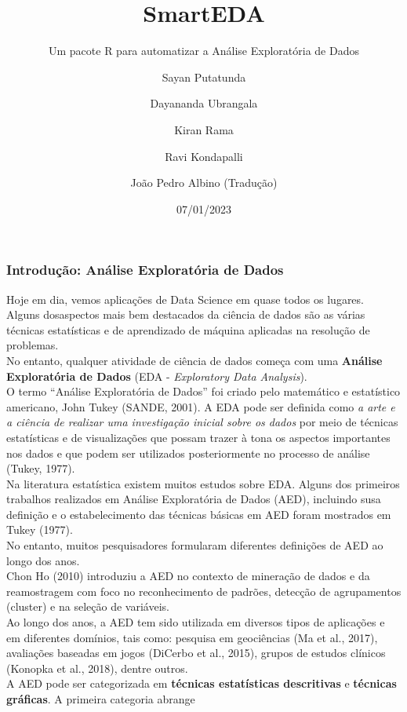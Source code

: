 \documentclass[
]{article}
\title{SmartEDA}
\subtitle{Um pacote R para automatizar a Análise Exploratória de Dados}
\author{Sayan Putatunda \and Dayananda Ubrangala \and Kiran
Rama \and Ravi Kondapalli \and João Pedro Albino (Tradução)}
\date{07/01/2023}
\begin{document}
\maketitle

\hypertarget{introduuxe7uxe3o-anuxe1lise-exploratuxf3ria-de-dados}{%
\subsubsection{Introdução: Análise Exploratória de
Dados}\label{introduuxe7uxe3o-anuxe1lise-exploratuxf3ria-de-dados}}

Hoje em dia, vemos aplicações de Data Science em quase todos os
lugares.\\
Alguns dosaspectos mais bem destacados da ciência de dados são as várias
técnicas estatísticas e de aprendizado de máquina aplicadas na resolução
de problemas.\\
No entanto, qualquer atividade de ciência de dados começa com uma
\textbf{Análise Exploratória de Dados} (EDA - \emph{Exploratory Data
Analysis}).\\
O termo ``Análise Exploratória de Dados'' foi criado pelo matemático e
estatístico americano, John Tukey (SANDE, 2001). A EDA pode ser definida
como \emph{a arte e a ciência de realizar uma investigação inicial sobre
os dados} por meio de técnicas estatísticas e de visualizações que
possam trazer à tona os aspectos importantes nos dados e que podem ser
utilizados posteriormente no processo de análise (Tukey, 1977).\\
Na literatura estatística existem muitos estudos sobre EDA. Alguns dos
primeiros trabalhos realizados em Análise Exploratória de Dados (AED),
incluindo susa definição e o estabelecimento das técnicas básicas em AED
foram mostrados em Tukey (1977).\\
No entanto, muitos pesquisadores formularam diferentes definições de AED
ao longo dos anos.\\
Chon Ho (2010) introduziu a AED no contexto de mineração de dados e da
reamostragem com foco no reconhecimento de padrões, detecção de
agrupamentos (cluster) e na seleção de variáveis.\\
Ao longo dos anos, a AED tem sido utilizada em diversos tipos de
aplicações e em diferentes domínios, tais como: pesquisa em geociências
(Ma et al., 2017), avaliações baseadas em jogos (DiCerbo et al., 2015),
grupos de estudos clínicos (Konopka et al., 2018), dentre outros.\\
A AED pode ser categorizada em \textbf{técnicas estatísticas
descritivas} e \textbf{técnicas gráficas}. A primeira categoria abrange
\end{document}
